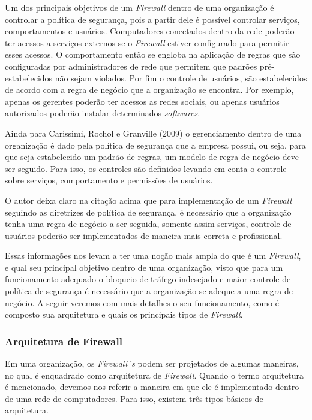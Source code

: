 Um dos principais objetivos de um \textit{Firewall} dentro de uma organização é controlar a política de segurança, pois a partir dele é possível controlar serviços, comportamentos e usuários. Computadores conectados dentro da rede poderão ter acessos a serviços externos se o \textit{Firewall} estiver configurado para permitir esses acessos. O comportamento então se engloba na aplicação de regras que são configuradas por administradores de rede que permitem que padrões pré-estabelecidos não sejam violados. Por fim o controle de usuários, são estabelecidos de acordo com a regra de negócio que a organização se encontra. Por exemplo, apenas os gerentes poderão ter acessos as redes sociais, ou apenas usuários autorizados poderão instalar determinados \textit{softwares}.

Ainda para Carissimi, Rochol e Granville (2009) o gerenciamento dentro de uma organização é dado pela política de segurança que a empresa possui, ou seja, para que seja estabelecido um padrão de regras, um modelo de regra de negócio deve ser seguido. Para isso, os controles são definidos levando em conta o controle sobre serviços, comportamento e permissões de usuários. 

O autor deixa claro na citação acima que para implementação de um \textit{Firewall} seguindo as diretrizes de política de segurança, é necessário que a organização tenha uma regra de negócio a ser seguida, somente assim serviços, controle de usuários poderão ser implementados de maneira mais correta e profissional.

Essas informações nos levam a ter uma noção mais ampla do que é um \textit{Firewall}, e qual seu principal objetivo dentro de uma organização, visto que para um funcionamento adequado o bloqueio de tráfego indesejado e maior controle de política de segurança é necessário que a organização se adeque a uma regra de negócio. A seguir veremos com mais detalhes o seu funcionamento, como é composto sua arquitetura e quais os principais tipos de \textit{Firewall}.

\subsubsection{Arquitetura de Firewall}
Em uma organização, os \textit{Firewall´s} podem ser projetados de algumas maneiras, no qual é enquadrado como arquitetura de \textit{Firewall}. Quando o termo arquitetura é mencionado, devemos nos referir a maneira em que ele é implementado dentro de uma rede de computadores. Para isso, existem três tipos básicos de arquitetura.

